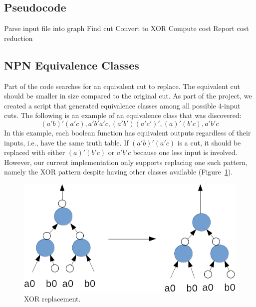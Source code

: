 \documentclass[twocolumn]{article}
\begin{document}
\subsection{Pseudocode}
\begin{algorithmic}[1]
\STATE Parse input file into graph
\STATE Find cut
\STATE Convert to XOR
\STATE Compute cost
\ENDIF
\ENDFOR
\ENDFOR
\STATE Report cost reduction
\end{algorithmic}
\subsection{NPN Equivalence Classes}
Part of the code searches for an equivalent cut to replace.  The equivalent cut should be smaller in size compared to the original cut.  As part of the project, we created a script that generated equivalence classes among all possible 4-input cuts.  The following is an example of an equivalence class that was discovered:\\
\begin{equation}
(a'b)'(a'c), a'b'a'c, (a'b')(a'c')', (a)'(b'c), a'b'c
\end{equation}
In this example, each boolean function has equivalent outputs regardless of their inputs, i.e., have the same truth table.  If $(a'b)'(a'c)$ is a cut, it should be replaced with either $(a)'(b'c)$ or $a'b'c$ because one less input is involved.  However, our current implementation only supports replacing one such pattern, namely the XOR pattern despite having other classes available (Figure~\ref{fig:Diagram}).

\begin{figure}[t]
\begin{center}
\includegraphics[scale=.5]{Graph.png}
\caption{XOR replacement.}
\label{fig:Diagram}
\end{center}
\end{figure}
\end{document}
